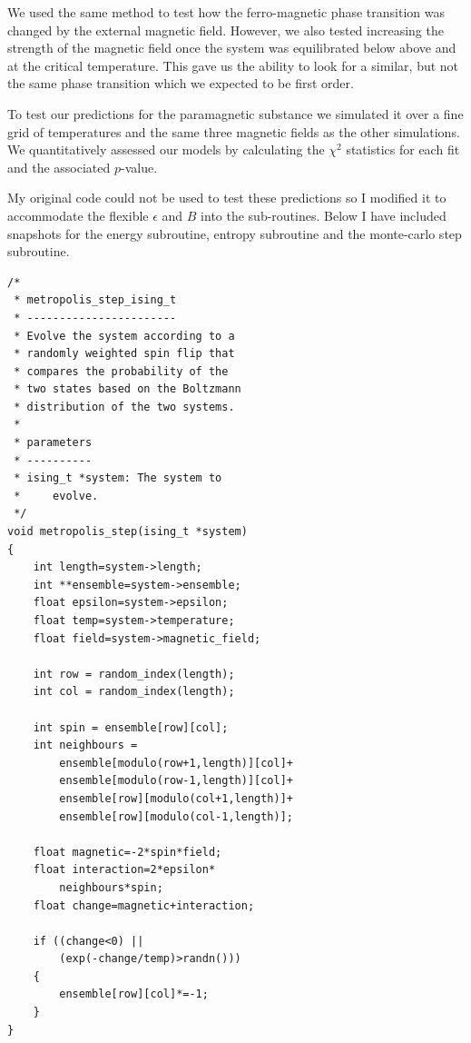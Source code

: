 \documentclass[a4paper, twocolumn]{article}
\begin{document}
We used the same method to test how the ferro-magnetic phase transition %
was changed by the external magnetic field. However, we also tested %
increasing the strength of the magnetic field once the system was %
equilibrated below above and at the critical temperature. This gave %
us the ability to look for a similar, but not the same phase transition %
which we expected to be first order. 


To test our predictions for the paramagnetic substance we simulated it %
over a fine grid of temperatures and the same three magnetic fields as %
the other simulations. We quantitatively assessed our models by calculating %
the \(\chi^{2}\) statistics for each fit and the associated \(p\)-value. %


My original code could not be used to test these predictions so I modified %
it to accommodate the flexible \(\epsilon\) and \(B\) into the sub-routines. %
Below I have included snapshots for the energy subroutine, entropy subroutine %
and the monte-carlo step subroutine. 

\begin{lstlisting}
/*
 * metropolis_step_ising_t
 * -----------------------
 * Evolve the system according to a 
 * randomly weighted spin flip that 
 * compares the probability of the 
 * two states based on the Boltzmann 
 * distribution of the two systems. 
 *
 * parameters
 * ----------
 * ising_t *system: The system to 
 *     evolve. 
 */
void metropolis_step(ising_t *system)
{
    int length=system->length;
    int **ensemble=system->ensemble;
    float epsilon=system->epsilon;
    float temp=system->temperature;
    float field=system->magnetic_field;

    int row = random_index(length);
    int col = random_index(length);

    int spin = ensemble[row][col];
    int neighbours = 
        ensemble[modulo(row+1,length)][col]+
        ensemble[modulo(row-1,length)][col]+
        ensemble[row][modulo(col+1,length)]+
        ensemble[row][modulo(col-1,length)];

    float magnetic=-2*spin*field;
    float interaction=2*epsilon*
        neighbours*spin;
    float change=magnetic+interaction;

    if ((change<0) || 
        (exp(-change/temp)>randn()))
    {
        ensemble[row][col]*=-1;
    }
}
\end{lstlisting}
\end{document}
